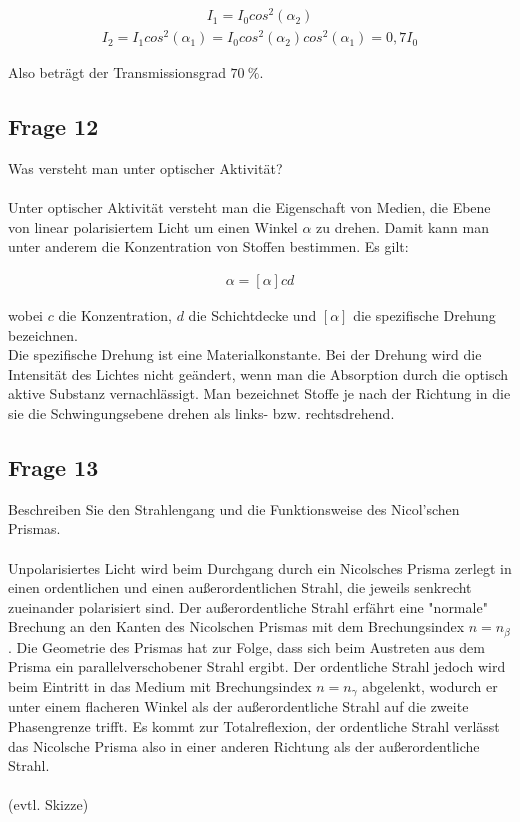 \documentclass[a4paper,10pt]{scrartcl}
\begin{document}
	    	\begin{align*}
	    	I_{1}=I_{0}cos^{2}(\alpha_{2})
	    	\end{align*}
	    	\begin{align*}
	    	I_{2}=I_{1}cos^{2}(\alpha_{1})=I_{0}cos^{2}(\alpha_{2})cos^{2}(\alpha_{1})=0,7I_{0}
	    	\end{align*}
	    	
	    	Also beträgt der Transmissionsgrad \(\SI{70}{\percent}\).
	    	
	    \subsection{Frage 12}
	    	Was versteht man unter optischer Aktivität?\\
	    	\\
	    	Unter optischer Aktivität versteht man die Eigenschaft von Medien, die Ebene von linear polarisiertem Licht um einen Winkel \(\alpha\) zu drehen. Damit kann man unter anderem die Konzentration von Stoffen bestimmen. Es gilt:
	    	
	    	\begin{align*}
	    	\alpha=[\alpha]cd
	    	\end{align*} 
	    	
	    	wobei \(c\) die Konzentration, \(d\) die Schichtdecke und \([\alpha]\) die spezifische Drehung bezeichnen.\\ Die spezifische Drehung ist eine Materialkonstante. Bei der Drehung wird die Intensität des Lichtes nicht geändert, wenn man die Absorption durch die optisch aktive Substanz vernachlässigt. Man bezeichnet Stoffe je nach der Richtung in die sie die Schwingungsebene drehen als links- bzw. rechtsdrehend.
	    	
	    \subsection{Frage 13}
	    	Beschreiben Sie den Strahlengang und die Funktionsweise des Nicol’schen
	    	Prismas.\\
	    	\\
	    	Unpolarisiertes Licht wird beim Durchgang durch ein Nicolsches Prisma zerlegt in einen ordentlichen und einen außerordentlichen Strahl, die jeweils senkrecht zueinander polarisiert sind. Der außerordentliche Strahl erfährt eine "normale" Brechung an den Kanten des Nicolschen Prismas mit dem Brechungsindex \(n=n_{\beta}\). Die Geometrie des Prismas hat zur Folge, dass sich beim Austreten aus dem Prisma ein parallelverschobener Strahl ergibt. Der ordentliche Strahl jedoch wird beim Eintritt in das Medium mit Brechungsindex \(n=n_{\gamma}\) abgelenkt, wodurch er unter einem flacheren Winkel als der außerordentliche Strahl auf die zweite Phasengrenze trifft. Es kommt zur Totalreflexion, der ordentliche Strahl verlässt das Nicolsche Prisma also in einer anderen Richtung als der außerordentliche Strahl.\\
	    	\\
	    	(evtl. Skizze)\\
	    	
\end{document}
